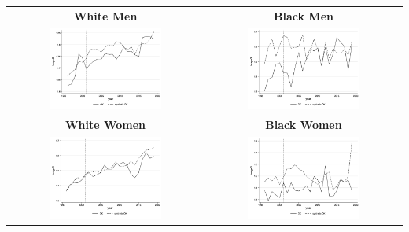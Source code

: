 \documentclass[11pt]{article}
\begin{document}
{\pagebreak
\begin{landscape}
\begin{table}[ht!]
    \centering
    \label{fig:synth_ok}
    \begin{tabular}{c c}
          \textbf{White Men} & \textbf{Black Men} \\
          \includegraphics[width = 0.6\textwidth, keepaspectratio]{figures/fin_synth_wm_ok.png} & \includegraphics[width = 0.6\textwidth, keepaspectratio]{figures/fin_synth_bm_ok.png} \\
          \textbf{White Women} & \textbf{Black Women} \\
          \includegraphics[width = 0.6\textwidth, keepaspectratio]{figures/fin_synth_wf_ok.png} & \includegraphics[width = 0.6\textwidth, keepaspectratio]{figures/fin_synth_bf_ok.png}

\end{tabular}
\end{table}
\end{landscape}}
\end{document}
